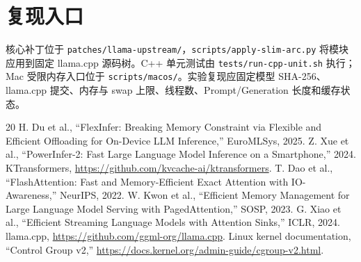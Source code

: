 \documentclass[a4paper]{article}
\begin{document}
\section{复现入口}

核心补丁位于 \texttt{patches/llama-upstream/}，\texttt{scripts/apply-slim-arc.py} 将模块应用到固定 llama.cpp 源码树。C++ 单元测试由 \texttt{tests/run-cpp-unit.sh} 执行；Mac 受限内存入口位于 \texttt{scripts/macos/}。实验复现应固定模型 SHA-256、llama.cpp 提交、内存与 swap 上限、线程数、Prompt/Generation 长度和缓存状态。

\begin{thebibliography}{20}
 H. Du et al., ``FlexInfer: Breaking Memory Constraint via Flexible and Efficient Offloading for On-Device LLM Inference,'' EuroMLSys, 2025.
 Z. Xue et al., ``PowerInfer-2: Fast Large Language Model Inference on a Smartphone,'' 2024.
 KTransformers, \url{https://github.com/kvcache-ai/ktransformers}.
 T. Dao et al., ``FlashAttention: Fast and Memory-Efficient Exact Attention with IO-Awareness,'' NeurIPS, 2022.
 W. Kwon et al., ``Efficient Memory Management for Large Language Model Serving with PagedAttention,'' SOSP, 2023.
 G. Xiao et al., ``Efficient Streaming Language Models with Attention Sinks,'' ICLR, 2024.
 llama.cpp, \url{https://github.com/ggml-org/llama.cpp}.
 Linux kernel documentation, ``Control Group v2,'' \url{https://docs.kernel.org/admin-guide/cgroup-v2.html}.
\end{thebibliography}
\end{document}
